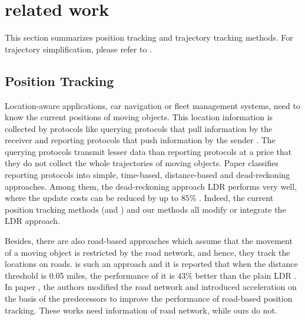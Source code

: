 
\section{related work}
\label{sec-related}

This section summarizes position tracking and trajectory tracking methods. For trajectory simplification, please refer to \cite{Zhang:Evaluation, Lin:Cised}.

\subsection{{Position Tracking}}

Location-aware applications, \eg car navigation or fleet management systems, need to know the current positions of moving objects. 
This location information is collected by protocols like querying protocols that pull information by the receiver and reporting protocols that push information by the sender \cite{Leonhardi:Comparison}.
The querying protocols transmit lesser data than reporting protocols at a price that they do not collect the whole trajectories of moving objects.
Paper \cite{Leonhardi:Comparison} classifies reporting protocols into simple, time-based, distance-based and dead-reckoning approaches. Among them, the dead-reckoning approach LDR \cite{Wolfson:PositionTracking, Wolfson:PlainDR} performs very well, where the update costs can be reduced by up to $85\%$ \cite{Wolfson:PositionTracking}. Indeed, the current position tracking methods (\ldrh and \grts) and our methods all modify or integrate the LDR approach.

Besides, there are also road-based approaches \cite{Civilis:Techniques, Civilis:RoadTracking, Wolfson:RoadTracking} which assume that the movement of a moving object is restricted by the road network, and hence, they track the locations on roads. \cite{Wolfson:RoadTracking} is such an approach and it is reported that when the distance threshold is 0.05 miles, the performance of it is $43\%$ better than the plain LDR \cite{Wolfson:PlainDR}. 
In paper \cite{Civilis:Techniques}, the authors modified the road network and introduced acceleration on the basis of the predecessors to improve the performance of road-based position tracking. These works need information of road network, while ours do not.

